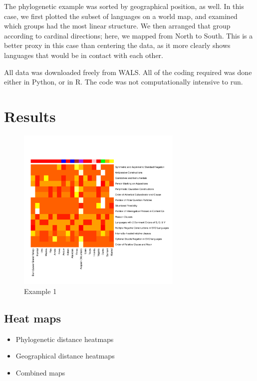 \documentclass[11pt]{article}
\begin{document}
The phylogenetic example was sorted by geographical position, as well. In this case, we first plotted the subset of languages on a world map, and examined which groups had the most linear structure. We then arranged that group according to cardinal directions; here, we mapped from North to South. This is a better proxy in this case than centering the data, as it more clearly shows languages that would be in contact with each other. 

All data was downloaded freely from WALS. All of the coding required was done either in Python, or in R. %
The code was not computationally intensive to run.

\section{Results} %


\begin{figure}[h]
\includegraphics[width=3.1in]
{graph2.pdf} 
\caption{Example 1} 
\label{fig:sparse} 
\end{figure}


\subsection{Heat maps}
\begin{itemize}
\item Phylogenetic distance heatmaps
\item Geographical distance heatmaps
\item Combined maps
\end{itemize}
\end{document}
